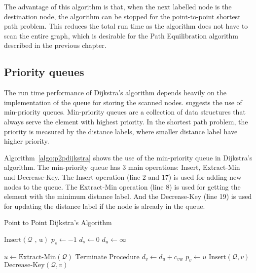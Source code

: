 The advantage of this algorithm is that,
when the next labelled node is the destination node,
the algorithm can be stopped for the point-to-point shortest path problem.
This reduces the total run time as the algorithm does not have to scan the entire graph,
which is desirable for the Path Equilibration algorithm described in the previous chapter.

\subsection{Priority queues} \label{sec:pq}
The run time performance of Dijkstra's algorithm depends heavily on the implementation of the queue for storing the scanned nodes.
\citet{Cormen} suggests the use of min-priority queues.
Min-priority queues are a collection of data structures that always serve the element with highest priority.
In the shortest path problem, the priority is measured by the distance labels, where smaller distance label have higher priority.

Algorithm~\ref{algo:p2pdijkstra} shows the use of the min-priority queue in Dijkstra's algorithm.
The min-priority queue has 3 main operations: Insert, Extract-Min and Decrease-Key.
The Insert operation (line $2$ and $17$) is used for adding new nodes to the queue.
The Extract-Min operation (line 8) is used for getting the element with the minimum distance label.
And the Decrease-Key (line 19) is used for updating the distance label if the node is already in the queue.

\begin{algorithm}[H]
    \caption{Point to Point Dijkstra's Algorithm}
    \label{algo:p2pdijkstra}
    \begin{algorithmic}[1]
        \State $\text{Insert}(\mathcal{Q}\text{ , u})$ 
        \State $p_s \gets -1$ 
        \State $d_s \gets 0$
         
        \State $d_u \gets \infty$
    \EndFor

    \State $ u \gets \text{Extract-Min}(\mathcal{Q}) $ 
    \State $\text{Terminate Procedure}$ 
\EndIf
{}
 
\State $d_v \gets d_u + c_{vw}$
\State $p_v \gets u$
\State $\text{Insert}(\mathcal{Q}, v)$ 
\Else
\State $\text{Decrease-Key}(\mathcal{Q}, v)$ 
    \EndIf
\EndIf
                \EndFor
            \EndIf
        \EndWhile
    \EndProcedure
\end{algorithmic}
\end{algorithm}

